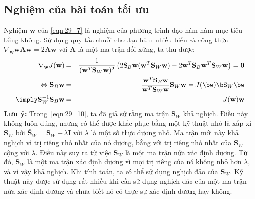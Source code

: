  
 
\subsection{Nghiệm của bài toán tối ưu}
Nghiệm $\mathbf{w}$ của \eqref{eqn:29_7} là nghiệm của phương trình đạo hàm
hàm mục tiêu bằng không. Sử dụng quy tắc chuỗi cho đạo hàm  nhiều biến và công
thức $\nabla_{\mathbf{w}}\mathbf{w} \mathbf{A}\mathbf{w} = 2\mathbf{Aw}$ với
$\mathbf{A}$ là một ma trận đối xứng, ta thu được: 
\begin{eqnarray} 
    \label{eqn:29_8}
    \nabla_{\mathbf{w}} J(\mathbf{w}) &=& \frac{1}{(\mathbf{w}^T\mathbf{S}_{W}\mathbf{w})^2} \left( 
    2\mathbf{S}_B \mathbf{w} (\mathbf{w}^T\mathbf{S}_{W}\mathbf{w}) - 2\mathbf{w}^T\mathbf{S}_{B}\mathbf{w}^T\mathbf{S}_W \mathbf{w} 
    \right) = \mathbf{0}\\\ 
    \label{eqn:29_9}
    \Leftrightarrow \mathbf{S}_B\mathbf{w} &=& \frac{\mathbf{w}^T\mathbf{S}_B
    \mathbf{w}}{\mathbf{w}^T\mathbf{S}_W\mathbf{w}}\mathbf{S}_W\mathbf{w} =
    J(\bw)\bS_W\bw\\\
    \label{eqn:29_10}
    \imply \mathbf{S}_W^{-1}\mathbf{S}_B \mathbf{w} &=& J(\mathbf{w})\mathbf{w}
\end{eqnarray} 
\textbf{Lưu ý:} Trong~\eqref{eqn:29_10}, ta đã giả sử rằng ma trận
$\mathbf{S}_W$ khả nghịch. Điều này không luôn đúng, nhưng có thể được khắc phục bằng một kỹ
thuật nhỏ là xấp xỉ $\mathbf{S}_W$ bởi $ \bar{\mathbf{S}}_W =
\mathbf{S}_W + \lambda\mathbf{I}$ với $\lambda$ là một số thực dương nhỏ. Ma
trận mới này khả nghịch vì trị riêng nhỏ nhất của nó dương, bằng với trị riêng nhỏ
nhất của $\mathbf{S}_W$ cộng với $\lambda$. Điều
này suy ra từ việc $\mathbf{S}_W$ là một ma trận nửa xác định dương. Từ đó,
$\bar{\mathbf{S}}_W$ là một ma trận xác định dương vì mọi trị riêng của nó không nhỏ hơn $\lambda$, và vì vậy khả nghịch. Khi tính toán, ta có thể sử
dụng nghịch đảo của $\bar{\mathbf{S}}_W$. Kỹ thuật này được sử dụng rất nhiều
khi cần sử dụng nghịch đảo của một ma trận nửa xác định dương và chưa biết nó có
thực sự xác định dương hay không.
 
